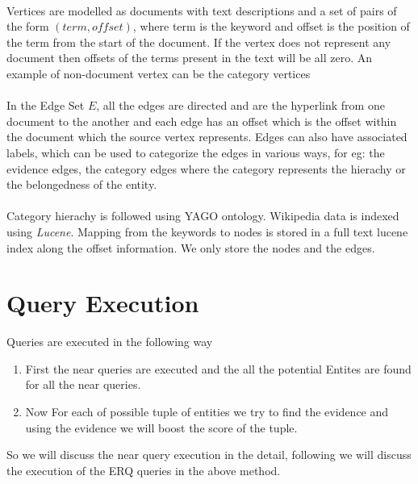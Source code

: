 \documentclass[a4paper,12pt]{report}
\begin{document}
\paragraph*{}
Vertices are modelled as documents with text descriptions and a set of pairs of the form $(term, offset)$, where term is the keyword and offset is the position of the term from the start of the document. If the vertex does not represent any document then offsets of the terms present in the text will be all zero. An example of non-document vertex can be the category vertices
\paragraph*{}
In the Edge Set $E$, all the edges are directed and are the hyperlink from one document to the another and each edge has an offset which is the offset within the document which the source vertex represents. Edges can also have associated labels, which can be used to categorize the edges in various ways, for eg: the evidence edges, the category edges where the category represents the hierachy or the belongedness of the entity.
\paragraph*{}
Category hierachy is followed using YAGO ontology. Wikipedia data is indexed using \textit{Lucene}. Mapping from the keywords to nodes is stored in a full text lucene index along the offset information. We only store the nodes and the edges.
\section{Query Execution}
Queries are executed in the following way
\begin{enumerate}
\item First the near queries are executed and the all the potential Entites are found for all the near queries.
\item Now For each of possible tuple of entities we try to find the evidence and using the evidence we will boost the score of the tuple.
\end{enumerate}
So we will discuss the near query execution in the detail, following we will discuss the execution of the ERQ queries in the above method.
\end{document}
